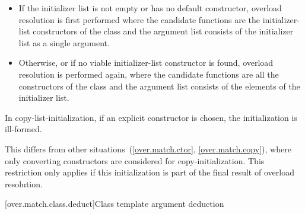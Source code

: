 \begin{itemize}
\item
If the initializer list is not empty or  has no default constructor,
overload resolution is first performed
where the candidate functions are the initializer-list constructors
of the class  and
the argument list consists of the initializer list as a single argument.

\item
Otherwise, or if no viable initializer-list constructor is found,
overload resolution is
performed again, where the candidate functions are all the constructors of
the class  and
the argument list consists of the elements of the initializer list.
\end{itemize}

In copy-list-initialization, if an explicit constructor is
chosen, the initialization is ill-formed.
\begin{note}
This differs from other situations~(\ref{over.match.ctor}, \ref{over.match.copy}),
where only converting constructors are considered for copy-initialization.
This restriction only
applies if this initialization is part of the final result of overload
resolution.
\end{note}

[over.match.class.deduct]{Class template argument deduction}%
%

